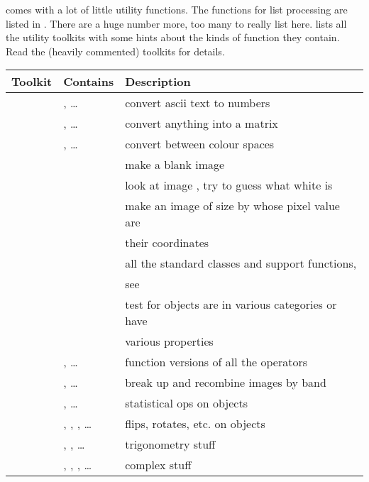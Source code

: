 \nip{} comes with a lot of little utility functions. The functions for list
processing are listed in . There are a huge number more, too
many to really list here.  lists all the utility toolkits
with some hints about the kinds of function they contain. Read the (heavily
commented) toolkits for details.

\begin{tab2}
\begin{center}
\begin{tabular}{||l|l|l||}
\hline
Toolkit & Contains & Description \\
\hline
\ct{\_convert}		& \ct{parse\_int l}, \ldots{}  		& 
	convert ascii text to numbers \\
			& \ct{to\_matrix x}, \ldots{}  		& 
	convert anything into a matrix \\
			& \ct{colour\_transform\_to to x}, \ldots{}	& 
	convert between colour spaces \\
\hline
\ct{\_generate}		& \ct{image\_new w h ...}  		& 
	make a blank image \\
			& \ct{image\_white i}  			& 
	look at image \ct{i}, try to guess what white is \\
			& \ct{make\_xy w h}  			& 
	make an image of size \ct{w} by \ct{h} whose pixel value are \\
			& 		  			& 
	their coordinates \\
\hline
\ct{\_types}		& \ct{Image i}  			& 
	all the standard classes and support functions, \\
			& 		  			& 
	see \pref{sec:object} \\
\hline
\ct{\_predicate}	& \ct{is\_colour\_space i} 		& 
	test for objects are in various categories or have \\
			& 		  			& 
	various properties \\
\hline
\ct{\_stdenv}		& \ct{logical\_and x}, \ldots{}		& 
	function versions of all the operators \\
			& \ct{bandsplit i}, \ldots{}		& 
	break up and recombine images by band \\
			& \ct{mean x}, \ldots{}			& 
	statistical ops on objects \\
			& \ct{transpose x}, \ct{flipud x}, \ct{rot90 x},
			\ldots{} 				& 
	flips, rotates, etc. on objects \\
			& \ct{rad x}, \ct{pi}, \ldots{}		& 
	trigonometry stuff \\
			& \ct{sign x}, \ct{conj x}, \ct{polar x}, \ldots{} & 
	complex stuff \\

\end{tabular}
\end{center}
\end{tab2}
